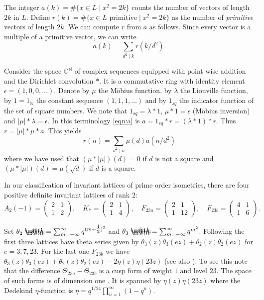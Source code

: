 \documentclass{amsart}
\makeatletter
\theoremstyle{definition}
\theoremstyle{plain}
\newcommand{\CC}{\mathbb{C}}
\newcommand{\NN}{\mathbb{N}}
\newcommand*{\defeq}{\mathrel{\rlap{%
                     \raisebox{0.3ex}{$\m@th\cdot$}}%
                     \raisebox{-0.3ex}{$\m@th\cdot$}}%
                     =}
\makeatother
\begin{document}
 The integer $a(k) = \#\{x \in L \mid x^2 = 2k\}$ counts the number of vectors of length $2k$ in $L$.
 Define $r(k) = \#\{x \in L \text{ primitive} \mid x^2 = 2k\}$
 as the number of \emph{primitive} vectors of length $2k$.
 We can compute $r$ from $a$ as follows.
 Since every vector is a multiple of a primitive vector,
 we can write
 \begin{equation}\label{eqn:a}
 a(k) = \sum_{d^2 \mid k} r(k/d^2).
 \end{equation}
 
 Consider the space $\CC^\NN$ of complex sequences equipped with point wise addition and the Dirichlet convolution $\ast$. It is a commutative ring with identity element $\epsilon=(1,0,0,\dots)$.
 Denote by $\mu$ the M\"obius function, by $\lambda$ the Liouville function, by $1=1_\NN$ the constant sequence $(1,1,1,\dots)$ and by $1_{sq}$ the indicator function of the set of square numbers.  We note that $1_{sq}=\lambda \ast 1$, $\mu \ast 1 = \epsilon$ (M\"obius inversion) and $|\mu| \ast \lambda = \epsilon$.
 In this terminology \cref{eqn:a} is $a = 1_{sq} \ast r = (\lambda \ast 1) \ast r$.
 Thus $r = |\mu| \ast \mu \ast a$. This yields
 \begin{equation}\label{eqn:primitive}
r(n)= \sum_{d^2 \mid n}\mu(d)a(n/d^2)
 \end{equation}
where we have used that $(\mu \ast |\mu|)(d)=0$ if $d$ is not a square and $(\mu \ast |\mu|)(d)=\mu(\sqrt{d})$ if $d$ is a square.

In our classification of invariant lattices of prime order isometries, there are four positive definite invariant lattices of rank $2$:
\[A_2(-1)=\left(\begin{matrix}2 & 1 \\1 & 2\end{matrix}\right),\quad
K_7=\left(\begin{matrix}2 & 1 \\1 & 4\end{matrix}\right),\quad
F_{23a}=\left(\begin{matrix}2 & 1 \\1 &12\end{matrix}\right),\quad
F_{23b}=\left(\begin{matrix}4 & 1 \\1 & 6\end{matrix}\right).\]

Set $\theta_2\defeq \sum_{m = -\infty}^{\infty} q^{(m+\tfrac{1}{2})^2}$ and
$\theta_3\defeq \sum_{m = -\infty}^{\infty} q^{m^2}$.
Following \cite[Ch.\ 4, \S 6.2]{conway_sloane} the first three lattices have theta series given by $\theta_3(z)\theta_3(ez) + \theta_2(z)\theta_2(ez)$ for $e=3,7,23$. For the last one $F_{23b}$ we have $\theta_3(z)\theta_3(ez) + \theta_2(z)\theta_2(ez) - 2\eta(z)\eta(23z)$ (see also \cite{blij}). To see this note that the difference $\Theta_{23a}-\Theta_{23b}$ is a cusp form of weight $1$ and level $23$. The space of such forms is of dimension one \cite[\href{http://www.lmfdb.org/ModularForm/GL2/Q/holomorphic/23/1/b/a/}{Modular Form 23.1.b.a}]{lmfdb}. It is spanned by $\eta(z)\eta(23z)$ where the Dedekind $\eta$-function is $\eta=q^{1/24}\prod_{n=1}^\infty(1-q^n)$.
\end{document}
